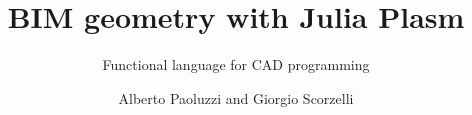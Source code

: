 \documentclass[graybox,envcountchap,sectrefs]{svmono}
\theoremstyle{plain}%
\theoremstyle{definition}
\begin{document}
\author{Alberto Paoluzzi and Giorgio Scorzelli}
\title{BIM geometry with Julia Plasm}
\subtitle{Functional language for CAD programming}
\maketitle



\frontmatter%






\tableofcontents

%


\mainmatter%





















\backmatter%


\printindex

\end{document}
